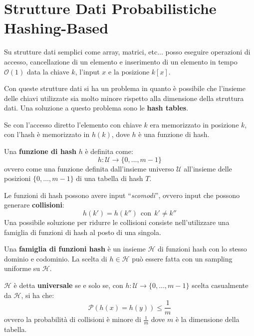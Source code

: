 \chapter{Strutture Dati Probabilistiche Hashing-Based}
Su strutture dati semplici come array, matrici, etc$\dots$ posso eseguire operazioni
di accesso, cancellazione di un elemento e inserimento di un elemento in tempo
$\mathcal{O}(1)$ data la chiave $k$, l'input $x$ e la posizione $k[x]$.

Con queste strutture dati si ha un problema in quanto è possibile che l'insieme
delle chiavi utilizzate sia molto minore rispetto alla dimensione della struttura
dati. Una soluzione a questo problema sono le \textbf{hash tables}.

Se con l'accesso diretto l'elemento con chiave $k$ era memorizzato in posizione
$k$, con l'hash è memorizzato in $h(k)$, dove $h$ è una funzione di hash.
\begin{definizione}
    Una \textbf{funzione di hash} $h$ è definita come:
    \begin{equation}
        h: \mathcal{U} \to \{0, \dots, m - 1\}
    \end{equation}
    ovvero come una funzione definita dall'insieme universo $\mathcal{U}$
    all'insieme delle posizioni $\{0, \dots, m - 1\}$ di una tabella di hash $T$.
\end{definizione}
Le funzioni di hash possono avere input ``\textit{scomodi}'', ovvero input che
possono generare \textbf{collisioni}:
\begin{equation}
    h(k') = h(k'') \ \ \text{con} \ \ k' \neq k''
\end{equation}
Una possibile soluzione per ridurre le collisioni consiste nell'utilizzare una
famiglia di funzioni di hash al posto di una singola.
\begin{definizione}
    Una \textbf{famiglia di funzioni hash} è un insieme $\mathcal{H}$ di funzioni
    hash con lo stesso dominio e codominio. La scelta di $h \in \mathcal{H}$ può
    essere fatta con un sampling uniforme su $\mathcal{H}$.
\end{definizione}
$\mathcal{H}$ è detta \textbf{universale} se e solo se, con $h : \mathcal{U} \to
    \{0, \dots, m - 1\}$ scelta casualmente da $\mathcal{H}$, si ha che:
\begin{equation}
    \mathcal{P}(h(x) = h(y)) \leq \frac{1}{m}
\end{equation}
ovvero la probabilità di collisioni è minore di $\frac{1}{m}$ dove $m$ è la
dimensione della tabella.

